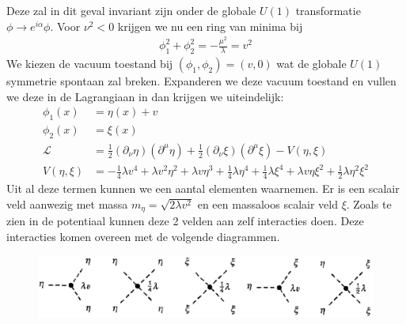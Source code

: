 \documentclass[../main.tex]{subfiles}
\begin{document}
Deze zal in dit geval invariant zijn onder de globale $U(1)$ transformatie $\phi \rightarrow e^{i\alpha}\phi$. Voor $\nu^2<0$ krijgen we nu een ring van minima bij
\begin{equation}
    \begin{aligned}
        \label{eq:complex_symm_breking}
        \phi_1^2+\phi_2^2 = -\frac{\mu^2}{\lambda} =v^2
    \end{aligned}
\end{equation}
We kiezen de vacuum toestand bij $(\phi_1, \phi_2) = (v,0)$ wat de globale $U(1)$ symmetrie spontaan zal breken. Expanderen we deze vacuum toestand en vullen we deze in de Lagrangiaan in dan krijgen we uiteindelijk:
\begin{equation}
    \begin{aligned}
        \label{eq:comple_scalair_veld_symm_breking}
        \phi_1(x) &= \eta(x) + v\\
        \phi_2(x) &= \xi(x)\\
        \mathcal{L} &= \frac{1}{2} (\partial_\nu \eta) (\partial^\mu \eta) + \frac{1}{2} (\partial_\nu \xi) (\partial^\mu \xi) - V(\eta, \xi)\\
        V(\eta, \xi) &= -\frac{1}{4} \lambda v^4 + \lambda v^2 \eta^2 + \lambda v \eta^3 + \frac{1}{4} \lambda \eta^4 + \frac{1}{4} \lambda \xi^4 + \lambda v \eta\xi^2 + \frac{1}{2} \lambda \eta^2\xi^2
    \end{aligned}
\end{equation}
Uit al deze termen kunnen we een aantal elementen waarnemen. Er is een scalair veld aanwezig met massa $m_\eta = \sqrt{2\lambda v^2}$ en een massaloos scalair veld $\xi$. Zoals te zien in de potentiaal kunnen deze 2 velden aan zelf interacties doen. Deze interacties komen overeen met de volgende diagrammen.

\begin{figure}[h]
    \centering
    \includegraphics[width=0.8\linewidth]{higgs_boson/complex_scalair_veld_int.png}
    \caption{}%
    \label{fig:higgs_boson/hoed_pot_comp}
\end{figure}
\end{document}
